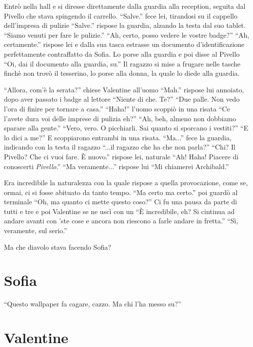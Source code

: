     Entrò nella hall e si diresse direttamente dalla guardia alla reception, seguita dal Pivello che stava spingendo il
    carrello. ``Salve.''  fece lei, tirandosi su il cappello dell'impresa di pulizie ``Salve.'' rispose la guardia,
    alzando la testa dal suo tablet.  ``Siamo venuti per fare le pulizie.'' ``Ah, certo, posso vedere le vostre badge?''
    ``Ah, certamente.'' rispose lei e dalla sua tasca estrasse un documento d'identificazione perfettamente
    contraffatto da Sofia. Lo porse alla guardia e poi disse al Pivello ``Oi, dai il documento alla guardia, su.'' Il
    ragazzo si mise a frugare nelle tasche finchè non trovò il tesserino, lo porse alla donna, la quale lo diede alla
    guardia.

    ``Allora, com'è la serata?'' chiese Valentine all'uomo ``Mah.'' rispose lui annoiato, dopo aver passato i badge al lettore
    ``Niente di che. Te?'' ``Due palle. Non vedo l'ora di finire per tornare a casa.'' ``Haha!'' l'uomo scoppiò in una
    risata ``Ce l'avete dura voi delle imprese di pulizia eh?'' ``Ah, beh, almeno non dobbiamo sparare alla gente.''
    ``Vero, vero. O picchiarli. Sai quanto si sporcano i vestiti?'' ``E lo dici a me?'' E scoppiarono entrambi in una
    risata. ``Ma...'' fece la guardia, indicando con la testa il ragazzo ``...il ragazzo che ha che non parla?'' ``Chi?
    Il Pivello? Che ci vuoi fare. È nuovo.'' rispose lei, naturale ``Ah! Haha! Piacere di conoscerti \emph{Pivello}.''
    ``Ma veramente...'' rispose lui ``Mi chiamerei Archibald.''

    Era incredibile la naturalezza con la quale rispose a quella provocazione, come se, ormai, ci si fosse abituato da
    tanto tempo. ``Ma certo ma certo.'' poi guardò al terminale ``Oh, ma quanto ci mette questo coso?'' Ci fu una pausa
    da parte di tutti e tre e poi Valentine se ne uscì con un ``È incredibile, eh? Si cintinua ad andare avanti con 'ste
    cose e ancora non riescono a farle andare in fretta.'' ``Sì, veramente, sul serio.''

    Ma che diavolo stava facendo Sofia?

  \section*{Sofia}

    ``Questo wallpaper fa cagare, cazzo. Ma chi l'ha messo su?''

  \section*{Valentine}

